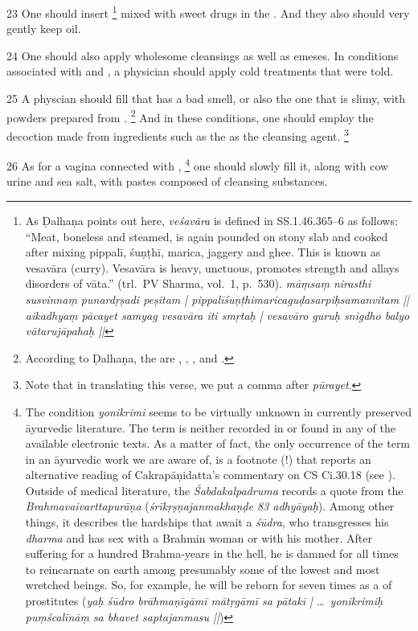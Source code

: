 \begin{translation}
\item [23]
One should insert %
	\footnote{%
	As Ḍalhaṇa points out here, \textit{veśavāra} is defined in SS.1.46.365--6 as follows: “Meat, boneless and steamed, is again pounded on stony slab and cooked after mixing pippalī, śuṇṭhī, marica, jaggery and ghee. This is known as vesavāra (curry). Vesavāra is heavy, unctuous, promotes strength and allays disorders of vāta.” (trl.\ PV Sharma, vol.\ 1, p.\ 530). 
	\textit{māṃsaṃ nirasthi susvinnaṃ punardṛṣadi peṣitam | pippalīśuṇṭhimaricaguḍasarpiḥsamanvitam || aikadhyaṃ pācayet samyag vesavāra iti smṛtaḥ | vesavāro guruḥ snigdho balyo vātarujāpahaḥ ||}
	} 
mixed with sweet drugs in the . And they also should very gently keep  oil.

\item [24]
One should also apply wholesome cleansings as well as emeses. 
In conditions associated with  and , a physician should apply cold treatments that were told.

\item [25]
A physcian should fill  that has a bad smell, or also the one that is slimy, with powders prepared from .%
	\footnote{%
	According to Ḍalhaṇa, the  are , , ,  and .
	} 
And in these conditions, one should employ the decoction made from ingredients such as the  as the cleansing agent.%
	\footnote{%
	Note that in translating this verse, we put a comma after \textit{pūrayet}.%
	}

\item [26]
As for a vagina connected with ,%
	\footnote{%
	The condition \textit{yonikrimi} seems to be virtually unknown in currently preserved  āyurvedic literature. The term is neither recorded in \textcite{josi-maha} or found in any of the available electronic texts. As a matter of fact, the only occurrence of the term in an āyurvedic work we are aware of, is a footnote (!) that reports an alternative reading of Cakrapāṇidatta's commentary on CS Ci.30.18 (see \textcite[635b]{cara-trikamji3}).
	Outside of medical literature, the \textit{Śabdakalpadruma} records a quote from the \textit{Brahmavaivarttapurāṇa} (\textit{śrīkṛṣṇajanmakhaṇḍe 83 adhyāyaḥ}). Among other things, it describes the hardships that await a \textit{śūdra}, who transgresses his \textit{dharma} and has sex with a Brahmin woman or with his mother. After suffering for a hundred Brahma-years in the hell, he is damned for all times to reincarnate on earth among presumably some of the lowest and most wretched beings. So, for example, he will be reborn for seven times as a  of prostitutes (\textit{yaḥ śūdro brāhmaṇīgāmī mātṛgāmī sa pātakī | \ldots\ yonikrimiḥ puṃścalīnāṃ sa bhavet saptajanmasu ||})     
	} 
one should slowly fill it, along with cow urine and sea salt, with pastes composed of cleansing substances.


\end{translation}

